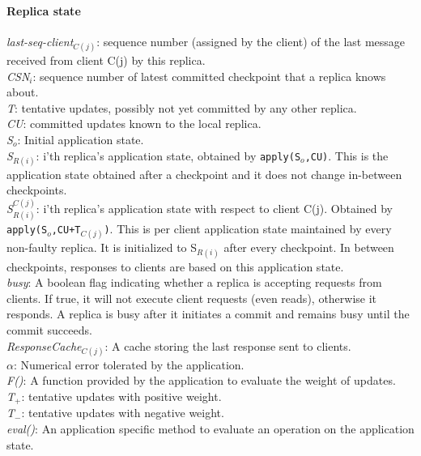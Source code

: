 \documentclass[twocolumn,10pt]{article}
\begin{document}
{\paragraph{Replica state}
\textit{last-seq-client$_{C(j)}$}: sequence number (assigned by the client) 
of the last message received from client C(j) by this replica.\\
\textit{CSN$_{i}$}: sequence number of latest committed checkpoint that a replica
knows about.\\
\textit{T}: tentative updates, possibly not yet committed by any other
replica.\\
\textit{CU}: committed updates known to the local replica.\\
\textit{S$_{o}$}: Initial application state.\\
\textit{S$_{R(i)}$}: i'th replica's application state, obtained by 
\texttt{apply(S$_{o}$,CU)}. This is the application state obtained after 
a checkpoint and it does not change in-between checkpoints.\\
\textit{S$_{R(i)}^{C(j)}$}: i'th replica's application state with respect to 
client C(j). Obtained by \texttt{apply(S$_{o}$,CU+T$_{C(j)}$)}. 
This is per client application state maintained by every non-faulty replica. 
It is initialized to S$_{R(i)}$ after every checkpoint. In between checkpoints, 
responses to clients are based on this application state.\\
\textit{busy}: A boolean flag indicating whether a replica is accepting requests
from clients. If true, it will not execute client requests (even reads), 
otherwise it  responds. A replica is busy after it initiates a commit and 
remains busy until the commit succeeds.\\
\textit{ResponseCache$_{C(j)}$}: A cache storing the last response sent to 
clients.\\
\textit{$\alpha$}: Numerical error tolerated by the application.\\
\textit{F()}: A function provided by the application to evaluate the weight 
of updates. \\
\textit{T$_{+}$}: tentative updates with positive weight.\\
\textit{T$_{-}$}: tentative updates with negative weight.\\
\textit{eval()}: An application specific method to evaluate an operation on the
application state.\\

}
\end{document}

